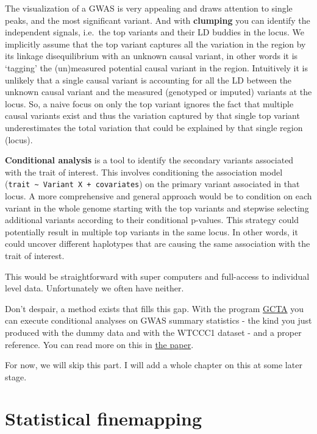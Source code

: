\documentclass[
]{book}
\begin{document}
The visualization of a GWAS is very appealing and draws attention to single peaks, and the most significant variant. And with \textbf{clumping} you can identify the independent signals, i.e.~the top variants and their LD buddies in the locus. We implicitly assume that the top variant captures all the variation in the region by its linkage disequilibrium with an unknown causal variant, in other words it is `tagging' the (un)measured potential causal variant in the region. Intuitively it is unlikely that a single causal variant is accounting for all the LD between the unknown causal variant and the measured (genotyped or imputed) variants at the locus. So, a naive focus on only the top variant ignores the fact that multiple causal variants exist and thus the variation captured by that single top variant underestimates the total variation that could be explained by that single region (locus).

\textbf{Conditional analysis} is a tool to identify the secondary variants associated with the trait of interest. This involves conditioning the association model (\texttt{trait\ \textasciitilde{}\ Variant\ X\ +\ covariates}) on the primary variant associated in that locus. A more comprehensive and general approach would be to condition on each variant in the whole genome starting with the top variants and stepwise selecting additional variants according to their conditional p-values. This strategy could potentially result in multiple top variants in the same locus. In other words, it could uncover different haplotypes that are causing the same association with the trait of interest.

This would be straightforward with super computers and full-access to individual level data. Unfortunately we often have neither.

Don't despair, a method exists that fills this gap. With the program \href{http://cnsgenomics.com/software/gcta/\#Overview}{GCTA} you can execute conditional analyses on GWAS summary statistics - the kind you just produced with the dummy data and with the WTCCC1 dataset - and a proper reference. You can read more on this in \href{https://www.nature.com/articles/ng.2213}{the paper}.

For now, we will skip this part. I will add a whole chapter on this at some later stage.

\hypertarget{statistical-finemapping}{%
\section{Statistical finemapping}\label{statistical-finemapping}}
\end{document}
